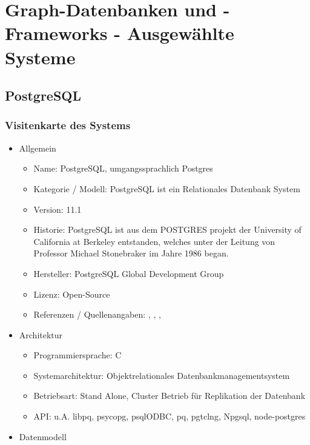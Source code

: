 \chapter{Graph-Datenbanken und -Frameworks - Ausgewählte Systeme }
\section{PostgreSQL}
\subsection{Visitenkarte des Systems}
    \begin{itemize}
        \item Allgemein
        \begin{itemize}
            \item Name: PostgreSQL, umgangssprachlich Postgres
            \item Kategorie / Modell: PostgreSQL ist ein Relationales Datenbank System
            \item Version: 11.1
            \item Historie: PostgreSQL ist aus dem POSTGRES projekt der University of California at Berkeley entstanden, welches unter der Leitung von  Professor Michael Stonebraker im Jahre 1986 began.
            \item Hersteller: PostgreSQL Global Development Group
            \item Lizenz: Open-Source
            \item Referenzen / Quellenangaben: \cite{froehlich01}, \cite{postgres2018}, \cite{postgresqldoc}, \cite{eisentraut01}
        \end{itemize}
        \item Architektur
        \begin{itemize}
            \item Programmiersprache: C
            \item Systemarchitektur: Objektrelationales Datenbankmanagementsystem
            \item Betriebsart: Stand Alone, Cluster Betrieb für Replikation der Datenbank
            \item API: u.A. libpq, psycopg, psqlODBC, pq, pgtclng, Npgsql, node-postgres
        \end{itemize}
        \item Datenmodell

\end{itemize}
